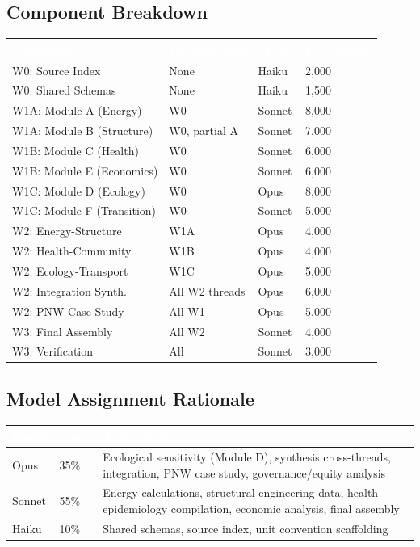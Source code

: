 \documentclass[11pt,letterpaper]{article}
\newcommand{\tableheader}[1]{\textbf{\sffamily\textcolor{white}{#1}}}
\begin{document}
\subsection{Component Breakdown}

\begin{center}
\begin{tabularx}{\textwidth}{L{3.5cm}L{2.5cm}C{1.5cm}C{2cm}}
\toprule
{}
\tableheader{Component} & \tableheader{Dependencies} & \tableheader{Model} & \tableheader{Est. Tokens} \\
\midrule
W0: Source Index & None & Haiku & 2,000 \\
W0: Shared Schemas & None & Haiku & 1,500 \\
W1A: Module A (Energy) & W0 & Sonnet & 8,000 \\
W1A: Module B (Structure) & W0, partial A & Sonnet & 7,000 \\
W1B: Module C (Health) & W0 & Sonnet & 6,000 \\
W1B: Module E (Economics) & W0 & Sonnet & 6,000 \\
W1C: Module D (Ecology) & W0 & Opus & 8,000 \\
W1C: Module F (Transition) & W0 & Sonnet & 5,000 \\
W2: Energy-Structure & W1A & Opus & 4,000 \\
W2: Health-Community & W1B & Opus & 4,000 \\
W2: Ecology-Transport & W1C & Opus & 5,000 \\
W2: Integration Synth. & All W2 threads & Opus & 6,000 \\
W2: PNW Case Study & All W1 & Opus & 5,000 \\
W3: Final Assembly & All W2 & Sonnet & 4,000 \\
W3: Verification & All & Sonnet & 3,000 \\
\bottomrule
\end{tabularx}
\end{center}

\subsection{Model Assignment Rationale}

\begin{center}
\begin{tabularx}{\textwidth}{L{2cm}C{1.5cm}X}
\toprule
{}
\tableheader{Model} & \tableheader{Share} & \tableheader{Assigned To} \\
\midrule
Opus & 35\% & Ecological sensitivity (Module D), synthesis cross-threads, integration, PNW case study, governance/equity analysis \\
Sonnet & 55\% & Energy calculations, structural engineering data, health epidemiology compilation, economic analysis, final assembly \\
Haiku & 10\% & Shared schemas, source index, unit convention scaffolding \\
\bottomrule
\end{tabularx}
\end{center}
\end{document}
